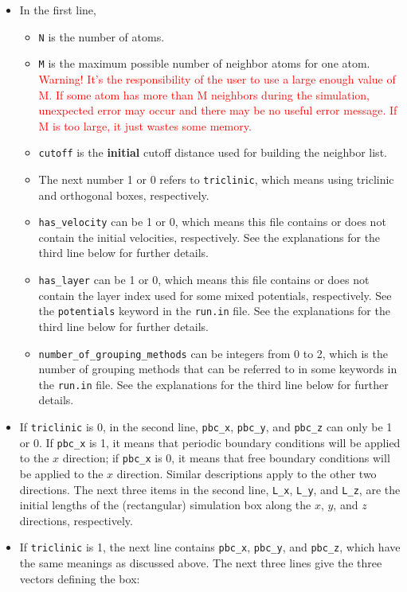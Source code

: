 \documentclass[12pt,a4paper]{report}
\begin{document}
\begin{itemize}
\item In the first line, 
\begin{itemize}
\item \verb"N" is the number of atoms.
\item \verb"M" is the maximum possible number of neighbor atoms for one atom. \textcolor{red}{Warning! It's the responsibility of the user to use a large enough value of M. If some atom has more than M neighbors during the simulation, unexpected error may occur and there may be no useful error message. If M is too large, it just wastes some memory. } 
\item \verb"cutoff" is the \textbf{initial} cutoff distance used for building the neighbor list. 
\item The next number 1 or 0 refers to \verb"triclinic", which means using triclinic and orthogonal boxes, respectively.
\item \verb"has_velocity" can be 1 or 0, which means this file contains or does not contain the initial velocities, respectively.  See the explanations for the third line below for further details.
\item \verb"has_layer" can be 1 or 0, which means this file contains or does not contain the layer index used for some mixed potentials, respectively. See the \verb"potentials" keyword in the \verb"run.in" file.  See the explanations for the third line below for further details.
\item \verb"number_of_grouping_methods" can be integers from 0 to 2, which is the number of grouping methods that can be referred to in some keywords in the \verb"run.in" file.  See the explanations for the third line below for further details.
\end{itemize}
\item If \verb"triclinic" is 0, in the second line, \verb"pbc_x",  \verb"pbc_y", and \verb"pbc_z" can only be 1 or 0. If \verb"pbc_x" is 1, it means that periodic boundary conditions will be applied to the $x$ direction; if \verb"pbc_x" is 0, it means that free boundary conditions will be applied to the $x$ direction. Similar descriptions apply to the other two directions. The next three items in the second line, \verb"L_x", \verb"L_y", and \verb"L_z", are the initial lengths of the (rectangular) simulation box along the $x$, $y$, and $z$ directions, respectively.
\item If \verb"triclinic" is 1, the next line contains \verb"pbc_x",  \verb"pbc_y", and \verb"pbc_z", which have the same meanings as discussed above. The next three lines give the three vectors defining the box:

\end{itemize}
\end{document}

